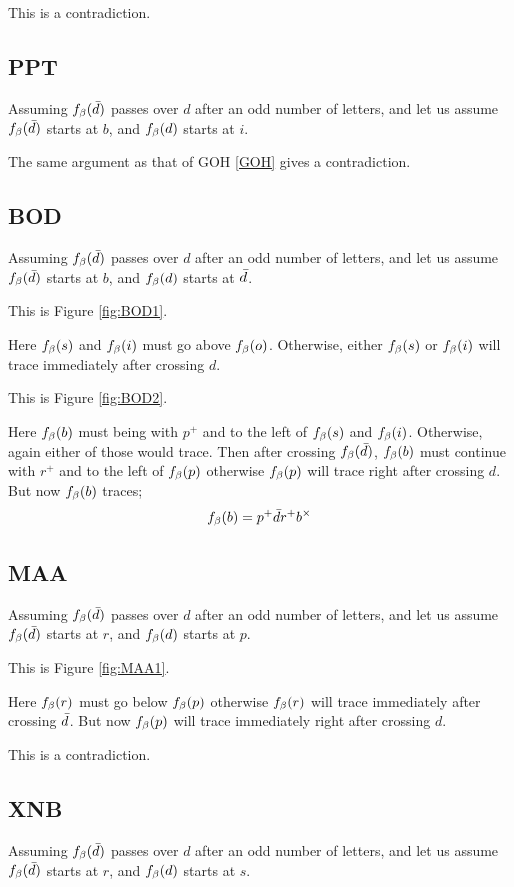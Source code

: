 This is a contradiction.

\subsection{PPT}\label{PPT}
Assuming $f_\beta(\bar{d})$ passes over $d$ after an odd number of letters, and let us assume $f_\beta(\bar{d})$ starts at $b$, and $f_\beta(d)$ starts at $i$.

The same argument as that of GOH \ref{GOH} gives a contradiction.


\subsection{BOD}\label{BOD}
Assuming $f_\beta(\bar{d})$ passes over $d$ after an odd number of letters, and let us assume $f_\beta(\bar{d})$ starts at $b$, and $f_\beta(d)$ starts at $\bar{d}$.

This is Figure \ref{fig:BOD1}.

Here $f_\beta(s)$ and $f_\beta(i)$ must go above $f_\beta(o)$. Otherwise, either $f_\beta(s)$ or $f_\beta(i)$ will trace immediately after crossing $d$. 


This is Figure \ref{fig:BOD2}.

Here $f_\beta(b)$ must being with $p^+$ and to the left of $f_\beta(s)$ and $f_\beta(i)$. Otherwise, again either of those would trace. Then after crossing $f_\beta(\bar{d})$, $f_\beta(b)$ must continue with $r^+$ and to the left of $f_\beta(p)$ otherwise $f_\beta(p)$ will trace right after crossing $d$. But now $f_\beta(b)$ traces;
\[
f_\beta(b) = p^+ \bar{d} r^+ b^\times
\]

\subsection{MAA}\label{MAA}
Assuming $f_\beta(\bar{d})$ passes over $d$ after an odd number of letters, and let us assume $f_\beta(\bar{d})$ starts at $r$, and $f_\beta(d)$ starts at $p$.

This is Figure \ref{fig:MAA1}.

Here $f_\beta(r)$ must go below $f_\beta(p)$ otherwise $f_\beta(r)$ will trace immediately after crossing $\bar{d}$. But now $f_\beta(p)$ will trace immediately right after crossing $d$.

This is a contradiction.

\subsection{XNB}\label{XNB}
Assuming $f_\beta(\bar{d})$ passes over $d$ after an odd number of letters, and let us assume $f_\beta(\bar{d})$ starts at $r$, and $f_\beta(d)$ starts at $s$.

